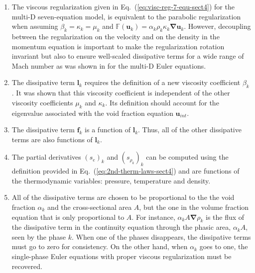 \documentclass[preprint,10pt]{elsarticle}
\newcommand{\grad}{\mbold{\nabla}}
\newcommand{\mbold}[1]{\boldsymbol#1}
\newcommand{\eqt}[1]{Eq.~(\ref{#1})}                     %
\newcommand{\tcr}[1]{\textcolor{red}{#1}}
\begin{document}
\begin{enumerate}
\item {The viscous regularization given in \eqt{eq:visc-reg-7-equ-sect4} for the multi-D seven-equation model, is equivalent to the parabolic regularization \cite{Parabolic} when assuming $\beta_k = \kappa_k = \mu_k$ and $\mathbb{F}(\mbold u_k) = \alpha_k \rho_k \kappa_k \grad \mbold u_k$. However, decoupling between the regularization on the velocity and on the density in the momentum equation is important to make the regularization rotation invariant but also to ensure well-scaled dissipative terms for a wide range of Mach number as was shown in \cite{Marco_paper_low_mach} for the multi-D Euler equations.}
\item {The dissipative term $\mbold l_k$ requires the definition of a new viscosity
    coefficient $\beta_k$. It was shown that this viscosity coefficient is independent of
    the other viscosity coefficients $\mu_k$ and $\kappa_k$. Its definition should
    account for the eigenvalue associated with the void fraction equation $\mbold u_{int}$.}

\item {The dissipative term $\mbold f_k$ is a function of $\mbold l_k$. Thus, all of the other
    dissipative terms are also functions of $\mbold l_k$.}

\item {The partial derivatives $(s_e)_k$ and $(s_{\rho_k})_k$ can be computed using the
    definition provided in \eqt{eq:2nd-therm-laws-sect4} and are functions of the thermodynamic
    variables: pressure, temperature and density.}

\item {All of the dissipative terms are chosen to be proportional to the the void
    fraction $\alpha_k$ and the cross-sectional area $A$, but the one in the volume fraction equation that is only proportional to $A$. For instance, $\alpha_k A \grad \rho_k$ is the
    flux of the dissipative term in the continuity equation through the phasic area, $\alpha_k A$, seen
    by the phase $k$. When one of the phases disappears, the dissipative terms
    must go to zero for consistency. On the other hand, when $\alpha_k$ goes to one,
    the single-phase Euler equations with proper viscous regularization must be recovered. }
    

\end{enumerate}
\end{document}
